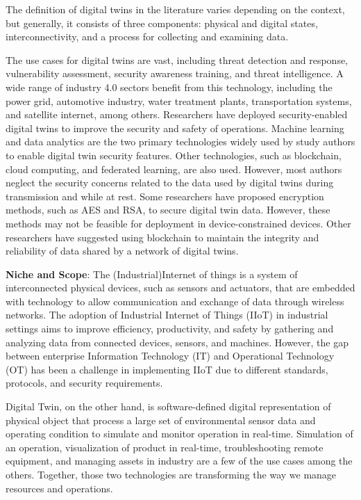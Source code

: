 The definition of digital twins in the literature varies depending on the context, but generally, it consists of three components: physical and digital states, interconnectivity, and a process for collecting and examining data.

The use cases for digital twins are vast, including threat detection and response, vulnerability assessment, security awareness training, and threat intelligence. A wide range of industry 4.0 sectors benefit from this technology, including the power grid, automotive industry, water treatment plants, transportation systems, and satellite internet, among others. Researchers have deployed security-enabled digital twins to improve the security and safety of operations.  
Machine learning and data analytics are the two primary technologies widely used by study authors to enable digital twin security features. Other technologies, such as blockchain, cloud computing, and federated learning, are also used. However, most authors neglect the security concerns related to the data used by digital twins during transmission and while at rest.  
Some researchers have proposed encryption methods, such as AES and RSA, to secure digital twin data. However, these methods may not be feasible for deployment in device-constrained devices. Other researchers have suggested using blockchain to maintain the integrity and reliability of data shared by a network of digital twins.  

\textbf{Niche and Scope}:
% 
The (Industrial)Internet of things is a system of interconnected physical devices, such as sensors and actuators, that are embedded with technology to allow communication and exchange of data through wireless networks\cite{maillet-contozEndtoendSecurityValidation2020}. The adoption of Industrial Internet of Things (IIoT) in industrial settings aims to improve efficiency, productivity, and safety by gathering and analyzing data from connected devices, sensors, and machines\cite{kumarBlockchainDeepLearning2022}. However, the gap between enterprise Information Technology (IT) and Operational Technology (OT) has been a challenge in implementing IIoT due to different standards, protocols, and security requirements\cite{adrienbacueDigitalTwinsEnhanced2022}.

Digital Twin, on the other hand, is software-defined digital representation of physical object that process a large set of environmental sensor data  and operating condition to simulate and monitor operation in real-time\cite{williamdanilczykANGELIntelligentDigital2019, danilczykSmartGridAnomaly2021}. Simulation of an operation, visualization of product in real-time, troubleshooting remote equipment, and managing assets in industry are a few of the use cases among the others. Together, those two technologies are transforming the way we manage resources and operations.


